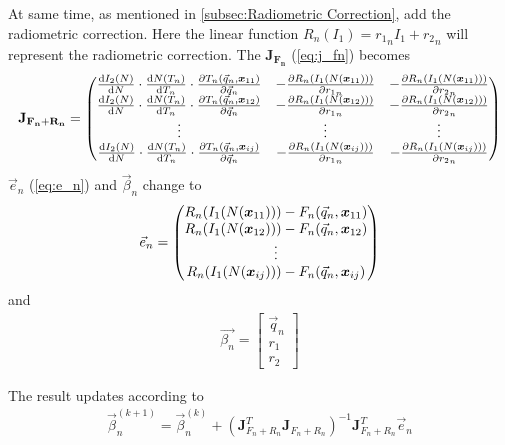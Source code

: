 At same time, as mentioned in \cref{subsec:Radiometric Correction}, add the radiometric correction. Here the linear function $R_n(I_1) = {r_1}_n I_1 + {r_2}_n$ will represent the radiometric correction. The $\mathbf{J_{F_n}}$ (\cref{eq:j_fn}) becomes 
\begin{align}
	\mathbf{J_{F_n+R_n}} =  \begin{pmatrix}
	\frac{\mathrm{d} I_2(N)}{\mathrm{d}N} \cdot \frac{\mathrm{d} N(T_n)}{\mathrm{d} T_n} \cdot \frac{\partial T_n(\vec{q}_n, \boldsymbol{x}_{11})}{\partial \vec{q}_n} & - \frac{\partial R_n(I_1(N(\boldsymbol{x}_{11})))}{\partial {r_1}_n} & - \frac{\partial R_n(I_1(N(\boldsymbol{x}_{11})))}{\partial {r_2}_n}\\ 
	\frac{\mathrm{d} I_2(N)}{\mathrm{d}N} \cdot\frac{\mathrm{d} N(T_n)}{\mathrm{d} T_n}\cdot \frac{\partial T_n(\vec{q}_n, \boldsymbol{x}_{12})}{\partial \vec{q}_n}& - \frac{\partial R_n(I_1(N(\boldsymbol{x}_{12})))}{\partial {r_1}_n} & - \frac{\partial R_n(I_1(N(\boldsymbol{x}_{12})))}{\partial {r_2}_n}\\ 
	\vdots &\vdots&\vdots\\ 
	\frac{\mathrm{d} I_2(N)}{\mathrm{d}N}\cdot \frac{\mathrm{d} N(T_n)}{\mathrm{d} T_n}\cdot \frac{\partial T_n(\vec{q}_n, \boldsymbol{x}_{ij})}{\partial \vec{q}_n}&- \frac{\partial R_n(I_1(N(\boldsymbol{x}_{ij})))}{\partial {r_1}_n} & - \frac{\partial R_n(I_1(N(\boldsymbol{x}_{ij})))}{\partial {r_2}_n}
	\end{pmatrix}
\end{align}
$\vec{e}_{n}$ (\cref{eq:e_n}) and $\vec{\beta}_n$ change to 
\begin{align}\label{eq:e_n2}
		\vec{e}_{n} = \begin{pmatrix} 
	R_n(I_1(N(\boldsymbol{x}_{11})))-F_n(\vec{q}_n, \boldsymbol{x}_{11})\\
	R_n(I_1(N(\boldsymbol{x}_{12})))-F_n(\vec{q}_n, \boldsymbol{x}_{12})\\
	\vdots\\
	R_n(I_1(N(\boldsymbol{x}_{ij})))-F_n(\vec{q}_n, \boldsymbol{x}_{ij})
	\end{pmatrix}
\end{align}
and
\begin{align}
	\vec{\beta_{n}} = \begin{bmatrix}
	\vec{q}_n \\
	r_1\\
	r_2
	\end{bmatrix}
\end{align}

The result updates according to 
\begin{align}\label{eq:simple}
	\vec{\beta}_n^{(k+1)} = \vec{\beta}_n^{(k)} +\left(\mathbf{J}_{F_n+R_n}^{T} \mathbf{J}_{F_n+R_n} \right)^{-1} \mathbf{J}_{F_n+R_n}^{T} \vec{e}_{n}
\end{align}

